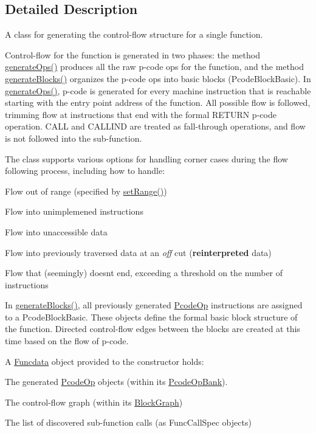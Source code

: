 \subsection{Detailed Description}
A class for generating the control-\/flow structure for a single function. 

Control-\/flow for the function is generated in two phases\+: the method \mbox{\hyperlink{class_flow_info_afe680152d016a3ec80e155f3ea85f26c}{generate\+Ops()}} produces all the raw p-\/code ops for the function, and the method \mbox{\hyperlink{class_flow_info_a5c8f51cb6c88719657801a2f26e87fae}{generate\+Blocks()}} organizes the p-\/code ops into basic blocks (Pcode\+Block\+Basic). In \mbox{\hyperlink{class_flow_info_afe680152d016a3ec80e155f3ea85f26c}{generate\+Ops()}}, p-\/code is generated for every machine instruction that is reachable starting with the entry point address of the function. All possible flow is followed, trimming flow at instructions that end with the formal R\+E\+T\+U\+RN p-\/code operation. C\+A\+LL and C\+A\+L\+L\+I\+ND are treated as fall-\/through operations, and flow is not followed into the sub-\/function.

The class supports various options for handling corner cases during the flow following process, including how to handle\+:
\begin{DoxyItemize}
\item Flow out of range (specified by \mbox{\hyperlink{class_flow_info_a4d268b911548180e9b86f4551d306477}{set\+Range()}})
\item Flow into unimplemened instructions
\item Flow into unaccessible data
\item Flow into previously traversed data at an {\itshape off} cut ({\bfseries{reinterpreted}} data)
\item Flow that (seemingly) doesn\textquotesingle{}t end, exceeding a threshold on the number of instructions
\end{DoxyItemize}

In \mbox{\hyperlink{class_flow_info_a5c8f51cb6c88719657801a2f26e87fae}{generate\+Blocks()}}, all previously generated \mbox{\hyperlink{class_pcode_op}{Pcode\+Op}} instructions are assigned to a Pcode\+Block\+Basic. These objects define the formal basic block structure of the function. Directed control-\/flow edges between the blocks are created at this time based on the flow of p-\/code.

A \mbox{\hyperlink{class_funcdata}{Funcdata}} object provided to the constructor holds\+:
\begin{DoxyItemize}
\item The generated \mbox{\hyperlink{class_pcode_op}{Pcode\+Op}} objects (within its \mbox{\hyperlink{class_pcode_op_bank}{Pcode\+Op\+Bank}}).
\item The control-\/flow graph (within its \mbox{\hyperlink{class_block_graph}{Block\+Graph}})
\item The list of discovered sub-\/function calls (as Func\+Call\+Spec objects)
\end{DoxyItemize}

